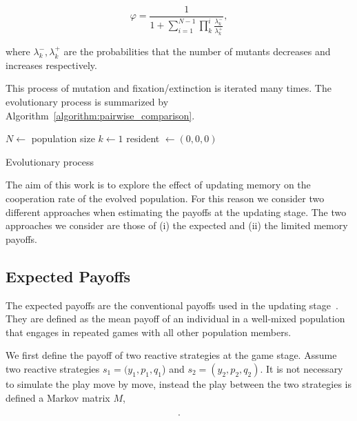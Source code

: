 \documentclass[11pt]{article}
\theoremstyle{plainCl1}
\theoremstyle{plainCl2}
\begin{document}
\begin{equation}\label{eq:appendix_fixation_probability}
\varphi = \frac{1}{1+\sum\limits_{i=1}^{N-1}\prod\limits_k^i \frac{\lambda^-_k}{\lambda^+_k}},
\end{equation}

where \(\lambda^-_k, \lambda^+_k\) are the probabilities that the number of
mutants decreases and increases respectively.

This process of mutation and fixation/extinction is iterated many times. The
evolutionary process is summarized by
Algorithm~\ref{algorithm:pairwise_comparison}.

\begin{algorithm}[!htbp]
  \SetAlgoLined
   $N \leftarrow$ population size\;
   $k \leftarrow 1$\;
   resident $\leftarrow (0, 0, 0)$\;
     \caption{Evolutionary process}\label{algorithm:pairwise_comparison}
\end{algorithm}

The aim of this work is to explore the effect of updating memory on the
cooperation rate of the evolved population. For this reason we consider two
different approaches when estimating the payoffs at the updating stage. The two
approaches we consider are those of (i) the expected and (ii) the limited memory
payoffs.

\subsection*{Expected Payoffs}

The expected payoffs are the conventional payoffs used in the updating
stage~\cite{imhof2010stochastic}. They are defined as the mean payoff of an
individual in a well-mixed population that engages in repeated games with all
other population members.

We first define the payoff of two reactive strategies at the game stage. Assume
two reactive strategies $s_1\!=\!(y_1, p_1, q_1$) and $s_2\!=\!(y_2,p_2,q_2)$.
It is not necessary to simulate the play move by move, instead the play between
the two strategies is defined a Markov matrix \(M\),

\begin{equation}\label{eq:transition_matrix}
  .
\end{equation}
\end{document}

